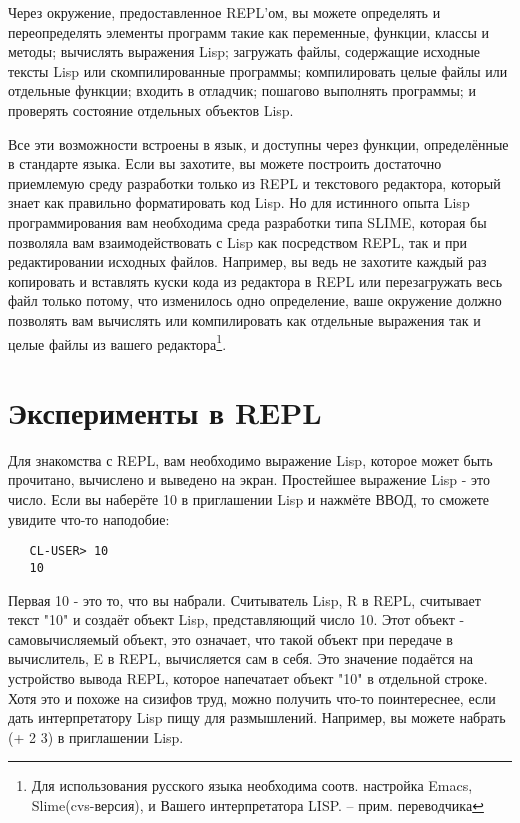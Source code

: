 Через окружение, предоставленное REPL'ом, вы можете определять и переопределять элементы
программ такие как переменные, функции, классы и методы; вычислять выражения Lisp;
загружать файлы, содержащие исходные тексты Lisp или скомпилированные программы;
компилировать целые файлы или отдельные функции; входить в отладчик; пошагово выполнять
программы; и проверять состояние отдельных объектов Lisp.

Все эти возможности встроены в язык, и доступны через функции, определённые в стандарте
языка. Если вы захотите, вы можете построить достаточно приемлемую среду разработки только
из REPL и текстового редактора, который знает как правильно форматировать код Lisp. Но для
истинного опыта Lisp программирования вам необходима среда разработки типа SLIME, которая
бы позволяла вам взаимодействовать с Lisp как посредством REPL, так и при редактировании
исходных файлов. Например, вы ведь не захотите каждый раз копировать и вставлять куски
кода из редактора в REPL или перезагружать весь файл только потому, что изменилось одно
определение, ваше окружение должно позволять вам вычислять или компилировать как отдельные
выражения так и целые файлы из вашего редактора\footnote{Для использования русского языка
  необходима соотв. настройка Emacs, Slime(cvs-версия), и Вашего интерпретатора LISP. --
  прим. переводчика}.

\section{Эксперименты в REPL}

Для знакомства с REPL, вам необходимо выражение Lisp, которое может быть прочитано, вычислено и выведено на экран. Простейшее выражение Lisp - это число. Если вы наберёте 10 в приглашении Lisp и нажмёте ВВОД, то сможете увидите что-то наподобие:

\begin{verbatim}
   CL-USER> 10
   10
\end{verbatim}

Первая 10 - это то, что вы набрали. Считыватель Lisp, R в REPL, считывает текст "10" и
создаёт объект Lisp, представляющий число 10. Этот объект - самовычисляемый объект, это
означает, что такой объект при передаче в вычислитель, E в REPL, вычисляется сам в
себя. Это значение подаётся на устройство вывода REPL, которое напечатает объект "10" в
отдельной строке. Хотя это и похоже на сизифов труд, можно получить что-то поинтереснее,
если дать интерпретатору Lisp пищу для размышлений. Например, вы можете набрать (+ 2 3) в
приглашении Lisp.

